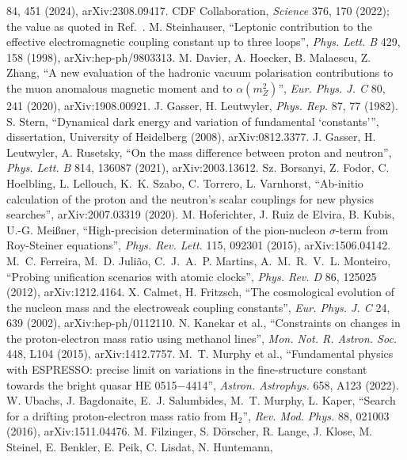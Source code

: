 84, 451 (2024), arXiv:2308.09417.
 CDF Collaboration, \emph{Science} 376, 170 (2022); the value as quoted in Ref.~\cite{deblas2022}.
 M. Steinhauser, ``Leptonic contribution to the effective electromagnetic coupling constant up to three loops'',
\emph{Phys. Lett. B} 429, 158 (1998), arXiv:hep-ph/9803313.
 M. Davier, A. Hoecker, B. Malaescu, Z. Zhang, ``A new evaluation of the hadronic vacuum polarisation contributions to the
muon anomalous magnetic moment and to $\alpha(m_Z^2)$'', \emph{Eur. Phys. J. C} 80, 241 (2020), arXiv:1908.00921.
 J. Gasser, H. Leutwyler, \emph{Phys. Rep.} 87, 77 (1982).
 S. Stern, ``Dynamical dark energy and variation of fundamental `constants''', dissertation, University of Heidelberg
(2008), arXiv:0812.3377.
 J. Gasser, H. Leutwyler, A. Rusetsky, ``On the mass difference between proton and neutron'', \emph{Phys. Lett. B} 814,
136087 (2021), arXiv:2003.13612.
 Sz. Borsanyi, Z. Fodor, C. Hoelbling, L. Lellouch, K.~K. Szabo, C. Torrero, L. Varnhorst, ``Ab-initio calculation of
the proton and the neutron's scalar couplings for new physics searches'', arXiv:2007.03319 (2020).
 M. Hoferichter, J. Ruiz de Elvira, B. Kubis, U.-G. Mei\ss{}ner, ``High-precision determination of the pion-nucleon
$\sigma$-term from Roy-Steiner equations'', \emph{Phys. Rev. Lett.} 115, 092301 (2015), arXiv:1506.04142.
 M.~C. Ferreira, M.~D. Juli\~ao, C.~J.~A.~P. Martins, A.~M.~R.~V.~L. Monteiro, ``Probing unification scenarios with
atomic clocks'', \emph{Phys. Rev. D} 86, 125025 (2012), arXiv:1212.4164.
 X. Calmet, H. Fritzsch, ``The cosmological evolution of the nucleon mass and the electroweak coupling constants'',
\emph{Eur. Phys. J. C} 24, 639 (2002), arXiv:hep-ph/0112110.
 N. Kanekar et al., ``Constraints on changes in the proton-electron mass ratio using methanol lines'', \emph{Mon. Not. R.
Astron. Soc.} 448, L104 (2015), arXiv:1412.7757.
 M.~T. Murphy et al., ``Fundamental physics with ESPRESSO: precise limit on variations in the fine-structure constant
towards the bright quasar HE 0515$-$4414'', \emph{Astron. Astrophys.} 658, A123 (2022).
 W. Ubachs, J. Bagdonaite, E.~J. Salumbides, M.~T. Murphy, L. Kaper, ``Search for a drifting proton-electron mass ratio
from H$_2$'', \emph{Rev. Mod. Phys.} 88, 021003 (2016), arXiv:1511.04476.
 M. Filzinger, S. D\"orscher, R. Lange, J. Klose, M. Steinel, E. Benkler, E. Peik, C. Lisdat, N. Huntemann,
